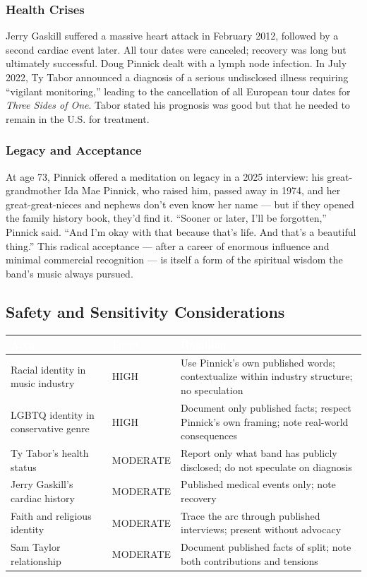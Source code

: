 \documentclass[11pt,letterpaper]{article}
\newcommand{\tableheader}[1]{\textbf{\sffamily\textcolor{white}{#1}}}
\begin{document}
\subsubsection{Health Crises}

Jerry Gaskill suffered a massive heart attack in February 2012, followed by a second cardiac event later. All tour dates were canceled; recovery was long but ultimately successful. Doug Pinnick dealt with a lymph node infection. In July 2022, Ty Tabor announced a diagnosis of a serious undisclosed illness requiring ``vigilant monitoring,'' leading to the cancellation of all European tour dates for \textit{Three Sides of One}. Tabor stated his prognosis was good but that he needed to remain in the U.S. for treatment.

\subsubsection{Legacy and Acceptance}

At age 73, Pinnick offered a meditation on legacy in a 2025 interview: his great-grandmother Ida Mae Pinnick, who raised him, passed away in 1974, and her great-great-nieces and nephews don't even know her name --- but if they opened the family history book, they'd find it. ``Sooner or later, I'll be forgotten,'' Pinnick said. ``And I'm okay with that because that's life. And that's a beautiful thing.'' This radical acceptance --- after a career of enormous influence and minimal commercial recognition --- is itself a form of the spiritual wisdom the band's music always pursued.

\subsection{Safety and Sensitivity Considerations}

\begin{center}
\begin{tabularx}{\textwidth}{L{3.5cm}C{2cm}X}
\toprule
{}
\tableheader{Area} & \tableheader{Level} & \tableheader{Handling} \\
\midrule
Racial identity in music industry & HIGH & Use Pinnick's own published words; contextualize within industry structure; no speculation \\
LGBTQ identity in conservative genre & HIGH & Document only published facts; respect Pinnick's own framing; note real-world consequences \\
Ty Tabor's health status & MODERATE & Report only what band has publicly disclosed; do not speculate on diagnosis \\
Jerry Gaskill's cardiac history & MODERATE & Published medical events only; note recovery \\
Faith and religious identity & MODERATE & Trace the arc through published interviews; present without advocacy \\
Sam Taylor relationship & MODERATE & Document published facts of split; note both contributions and tensions \\
\bottomrule
\end{tabularx}
\end{center}
\end{document}
